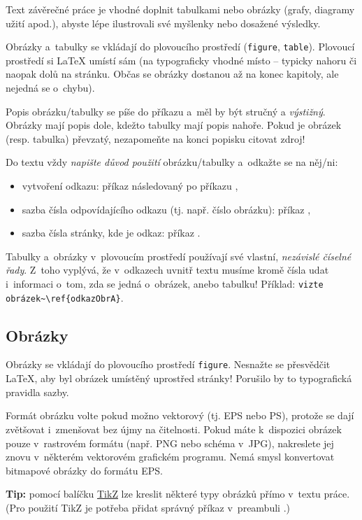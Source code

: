 Text závěrečné práce je vhodné doplnit tabulkami nebo obrázky (grafy, diagramy užití apod.), abyste lépe ilustrovali své myšlenky nebo dosažené výsledky. 
\par 
Obrázky a~tabulky se vkládají do plovoucího prostředí (\texttt{figure}, \texttt{table}). {\color{red} Plovoucí prostředí si LaTeX umístí sám} (na typograficky vhodné místo -- typicky nahoru či naopak dolů na stránku. Občas se obrázky dostanou až na konec kapitoly, ale nejedná se o~chybu).
\par 
Popis obrázku/tabulky se píše do příkazu  a~měl by být stručný a {\em výstižný}. Obrázky mají popis dole, kdežto tabulky mají popis nahoře. Pokud je obrázek (resp. tabulka) převzatý, nezapomeňte na konci popisku citovat zdroj!
\par 
Do textu vždy {\em napište důvod použití\/} obrázku/tabulky a~odkažte se na něj/ni:
\begin{itemize}
\item vytvoření odkazu: příkaz  následovaný po příkazu ,
\item sazba čísla odpovídajícího odkazu (tj. např. číslo obrázku): příkaz ,
\item sazba čísla stránky, kde je odkaz: příkaz .
\end{itemize}   
Tabulky a~obrázky v~plovoucím prostředí používají své vlastní, {\em nezávislé číselné řady}. Z~toho vyplývá, že v~odkazech uvnitř textu musíme kromě čísla udat i~informaci o~tom, zda se jedná o~obrázek, anebo tabulku! Příklad: \texttt{vizte obrázek\textasciitilde\textbackslash ref\{odkazObrA\}}.
\par

\subsection{Obrázky}
Obrázky se vkládají do plovoucího prostředí \texttt{figure}. Nesnažte se přesvědčit \LaTeX, aby byl obrázek umístěný uprostřed stránky! Porušilo by to typografická pravidla sazby.\par 
Formát obrázku volte pokud možno vektorový (tj. EPS nebo PS), protože se dají zvětšovat i~zmenšovat bez újmy na čitelnosti. Pokud máte k~dispozici obrázek pouze v~rastrovém formátu (např. PNG nebo schéma v~JPG), nakreslete jej znovu v~některém vektorovém grafickém programu. Nemá smysl konvertovat bitmapové obrázky do formátu EPS.
\par 
{\bf Tip:} pomocí balíčku \href{https://texample.net/}{\underline{TikZ}} lze kreslit některé typy obrázků přímo v~textu práce. (Pro použití TikZ je potřeba přidat správný příkaz  v~preambuli .)

